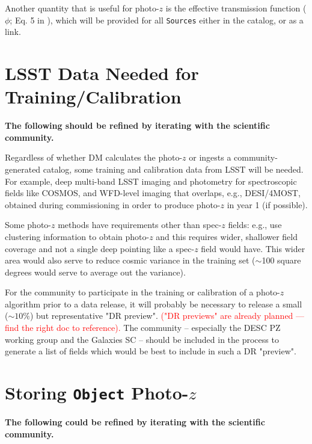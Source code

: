 \documentclass[DM,lsstdraft,toc]{lsstdoc}
\begin{document}
Another quantity that is useful for photo-$z$ is the effective transmission function ($\phi$; Eq. 5 in ), which will be provided for all {\tt Sources} either in the catalog, or as a link.





\clearpage
\section{LSST Data Needed for Training/Calibration}\label{sec:calib}

{\bf The following should be refined by iterating with the scientific community.}

Regardless of whether DM calculates the photo-$z$ or ingests a community-generated catalog, some training and calibration data from LSST will be needed.
For example, deep multi-band LSST imaging and photometry for spectroscopic fields like COSMOS, and WFD-level imaging that overlaps, e.g., DESI/4MOST, obtained during commissioning in order to produce photo-$z$ in year 1 (if possible).

Some photo-$z$ methods have requirements other than spec-$z$ fields: e.g., \citet{2019MNRAS.483.2801S} use clustering information to obtain photo-$z$ and this requires wider, shallower field coverage and not a single deep pointing like a spec-$z$ field would have. 
This wider area would also serve to reduce cosmic variance in the training set ($\sim$100 square degrees would serve to average out the variance).

For the community to participate in the training or calibration of a photo-$z$ algorithm prior to a data release, it will probably be necessary to release a small ($\sim10\%$) but representative "DR preview". \textcolor{red}{("DR previews" are already planned --- find the right doc to reference).}
The community -- especially the DESC PZ working group and the Galaxies SC -- should be included in the process to generate a list of fields which would be best to include in such a DR "preview".


\clearpage
\section{Storing {\tt Object} Photo-$z$}\label{sec:store}

{\bf The following could be refined by iterating with the scientific community.}
\end{document}
